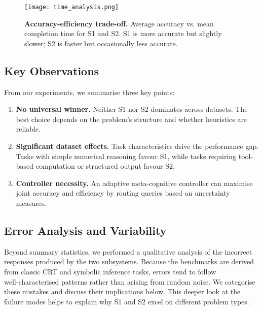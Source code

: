 \documentclass[11pt]{article}
\begin{document}
\begin{figure}[t]
  \centering
  \texttt{[image: time\_analysis.png]}
  \caption{\textbf{Accuracy-efficiency trade-off.}
    Average accuracy vs. mean completion time for S1 and S2.
    S1 is more accurate but slightly slower; S2 is faster but occasionally less accurate.}
  \label{fig:time_analysis}
\end{figure}
\FloatBarrier

\subsection{Key Observations}
From our experiments, we summarise three key points:
\begin{enumerate}
  \item \textbf{No universal winner.}  Neither S1 nor S2 dominates across
    datasets.  The best choice depends on the problem's structure and
    whether heuristics are reliable.
  \item \textbf{Significant dataset effects.}  Task characteristics
    drive the performance gap.  Tasks with simple numerical
    reasoning favour S1, while tasks requiring tool-based computation
    or structured output favour S2.
  \item \textbf{Controller necessity.}  An adaptive meta-cognitive
    controller can maximise joint accuracy and efficiency by routing queries
    based on uncertainty measures.
\end{enumerate}

\subsection{Error Analysis and Variability}
Beyond summary statistics, we performed a qualitative analysis of the
incorrect responses produced by the two subsystems.  Because the
benchmarks are derived from classic CRT and symbolic inference tasks,
errors tend to follow well‑characterised patterns rather than arising
from random noise.  We categorise these mistakes and discuss their
implications below.  This deeper look at the failure modes helps to
explain why S1 and S2 excel on different problem types.
\end{document}

